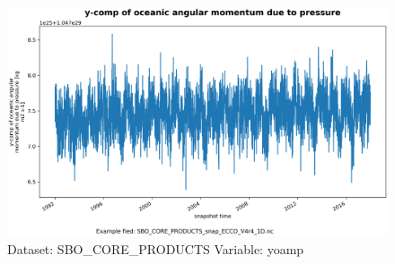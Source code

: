 \begin{figure}[H]
\centering
\includegraphics[scale=0.55]{../images/plots/oneD_plots/SBO_Core_Products/yoamp.png}
\caption{Dataset: SBO\_CORE\_PRODUCTS Variable: yoamp}
\label{tab:table-SBO_CORE_PRODUCTS_yoamp-Plot}
\end{figure}
\pagebreak
